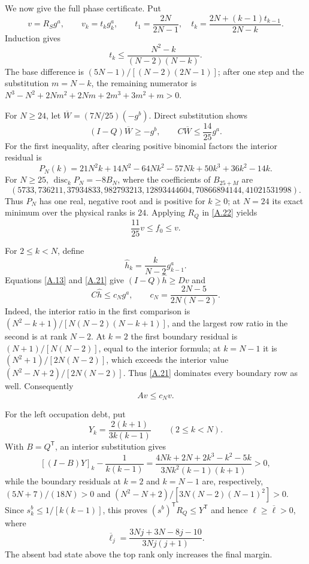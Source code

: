 We now give the full phase certificate.  Put
\[
 v=R_Sg^a,\qquad v_k=t_k g_k^a,\qquad
 t_1={\frac{2N}{2N-1}},\quad
 t_k={\frac{2N+(k-1)t_{k-1}}{2N-k}}.                           \tag{A.20}\label{A.20}
\]
Induction gives
\[
 t_k\le {\frac{N^2-k}{(N-2)(N-k)}}.                            \tag{A.21}\label{A.21}
\]
The base difference is $(5N-1)/[(N-2)(2N-1)]$; after one step and the
substitution $m=N-k$, the remaining numerator is
$N^3-N^2+2Nm^2+2Nm+2m^3+3m^2+m>0$.

For $N\ge24$, let $\overline W=(7N/25)(-g^b)$.  Direct substitution shows
\[
 (I-Q)\overline W\ge-g^b,\qquad
 C\overline W\le {\frac{14}{25}}g^a.                           \tag{A.22}\label{A.22}
\]
For the first inequality, after clearing positive binomial factors the
interior residual is
\[
 P_N(k)=21N^2k+14N^2-64Nk^2-57Nk+50k^3+36k^2-14k.          \tag{A.23}\label{A.23}
\]
For $N\ge25$, $\operatorname{disc}_kP_N=-8B_N$, where the coefficients of
$B_{25+M}$ are
\[
 (5733,736211,37934833,982793213,12893444604,
 70866894144,41021531998).                                 \tag{A.24}\label{A.24}
\]
Thus $P_N$ has one real, negative root and is positive for $k\ge0$; at
$N=24$ its exact minimum over the physical ranks is $24$.  Applying $R_Q$
in \eqref{A.22} yields
\[
 {\frac{11}{25}}v\le f_0\le v.                                \tag{A.25}\label{A.25}
\]

For $2\le k<N$, define
\[
 \widehat h_k={\frac{k}{ N-2}}g^a_{k-1}.                       \tag{A.26}\label{A.26}
\]
Equations \eqref{A.13} and \eqref{A.21} give
$(I-Q)\widehat h\ge Dv$ and
\[
 C\widehat h\le c_Ng^a,\qquad
 c_N={\frac{2N-5}{2N(N-2)}}.
\]
Indeed, the interior ratio in the first comparison is
$(N^2-k+1)/[N(N-2)(N-k+1)]$, and the largest row ratio in the second is
at rank $N-2$.  At $k=2$ the first boundary residual is
$(N+1)/[N(N-2)]$, equal to the interior formula; at $k=N-1$ it is
$(N^2+1)/[2N(N-2)]$, which exceeds the interior value
$(N^2-N+2)/[2N(N-2)]$.  Thus \eqref{A.21} dominates every boundary row as
well.  Consequently
\[
 Av\le c_Nv.                                               \tag{A.27}\label{A.27}
\]

For the left occupation debt, put
\[
 Y_k={\frac{2(k+1)}{3k(k-1)}}\qquad(2\le k<N).                 \tag{A.28}\label{A.28}
\]
With $B=Q^{\mathsf T}$, an interior substitution gives
\[
 [(I-B)Y]_k-{\frac{1}{ k(k-1)}}
 ={\frac{4Nk+2N+2k^3-k^2-5k}{3Nk^2(k-1)(k+1)}}>0,             \tag{A.29}\label{A.29}
\]
while the boundary residuals at $k=2$ and $k=N-1$ are, respectively,
$(5N+7)/(18N)>0$ and
$(N^2-N+2)/[3N(N-2)(N-1)^2]>0$.  Since
$s^b_k\le1/[k(k-1)]$, this proves
$(s^b)^{\mathsf T}R_Q\le Y^{\mathsf T}$ and hence
$\ell\ge\overline\ell>0$, where
\[
 \overline\ell_j={\frac{3Nj+3N-8j-10}{3Nj(j+1)}}.             \tag{A.30}\label{A.30}
\]
The absent bad state above the top rank only increases the final margin.

